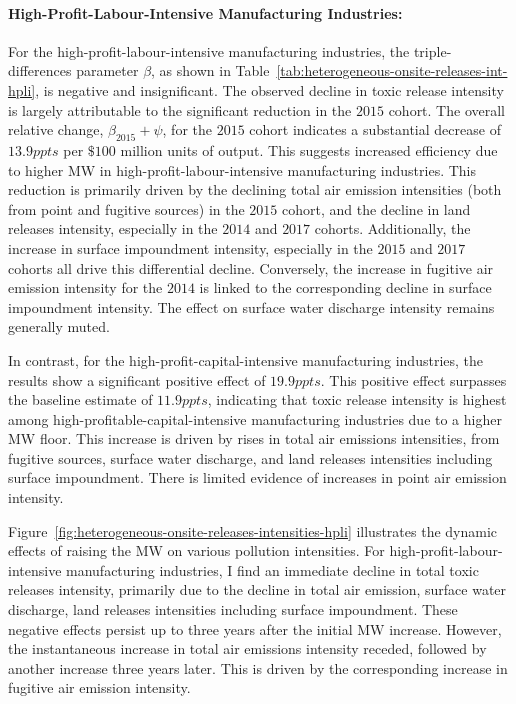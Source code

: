 \documentclass{C:/Users/david/OneDrive/Documents/ULMS/PhD/Thesis/chapter3/src/climate_change/latex/Economic_Journal/OUP-EJ}
\begin{document}
    \paragraph{High-Profit-Labour-Intensive Manufacturing Industries:}
    For the high-profit-labour-intensive manufacturing industries, the triple-differences parameter $\beta$, as shown in Table~\ref{tab:heterogeneous-onsite-releases-int-hpli}, is negative and insignificant. The observed decline in toxic release intensity is largely attributable to the significant reduction in the $2015$ cohort. The overall relative change, $\beta_{2015} + \psi$, for the $2015$ cohort indicates a substantial decrease of $13.9ppts$ per $\$100$ million units of output. This suggests increased efficiency due to higher MW in high-profit-labour-intensive manufacturing industries. This reduction is primarily driven by the declining total air emission intensities (both from point and fugitive sources) in the $2015$ cohort, and the decline in land releases intensity, especially in the $2014$ and $2017$ cohorts. Additionally, the increase in surface impoundment intensity, especially in the $2015$ and $2017$ cohorts all drive this differential decline. Conversely, the increase in fugitive air emission intensity for the $2014$ is linked to the corresponding decline in surface impoundment intensity. The effect on surface water discharge intensity remains generally muted.
    

    In contrast, for the high-profit-capital-intensive manufacturing industries, the results show a significant positive effect of $19.9ppts$. This positive effect surpasses the baseline estimate of $11.9ppts$, indicating that toxic release intensity is highest among high-profitable-capital-intensive manufacturing industries due to a higher MW floor. This increase is driven by rises in total air emissions intensities, from fugitive sources, surface water discharge, and land releases intensities including surface impoundment. There is limited evidence of increases in point air emission intensity.

    Figure~\ref{fig:heterogeneous-onsite-releases-intensities-hpli} illustrates the dynamic effects of raising the MW on various pollution intensities. For high-profit-labour-intensive manufacturing industries, I find an immediate decline in total toxic releases intensity, primarily due to the decline in total air emission, surface water discharge, land releases intensities including surface impoundment. These negative effects persist up to three years after the initial MW increase. However, the instantaneous increase in total air emissions intensity receded, followed by another increase three years later. This is driven by the corresponding increase in fugitive air emission intensity.
    
\end{document}
